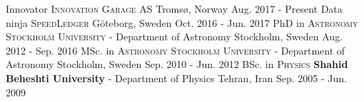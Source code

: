 \begin{cventries}
  \cventry
    {\normalsize Innovator}
    {\textsc{Innovation Garage AS}}
    {\normalsize Tromsø, Norway}
    {\normalsize Aug. 2017 - Present}
    {}
  \cventry
    {\normalsize Data ninja}
    {\textsc{SpeedLedger}}
    {\normalsize Göteborg, Sweden}
    {\normalsize Oct. 2016 - Jun. 2017}
    {}
  \cventry
    {\normalsize PhD in \textsc{Astronomy}}
    {\textsc{Stockholm University} - Department of Astronomy}
    {\normalsize Stockholm, Sweden}
    {\normalsize Aug. 2012 - Sep. 2016}
    {}
  \cventry
    {\normalsize MSc. in \textsc{Astronomy}}
    {\textsc{Stockholm University} - Department of Astronomy}
    {\normalsize Stockholm, Sweden}
    {\normalsize Sep. 2010 - Jun. 2012}
    {}
  \cventry
    {\normalsize BSc. in \textsc{Physics}}
    {\textbf{Shahid Beheshti University} - Department of Physics}
    {\normalsize Tehran, Iran}
    {\normalsize Sep. 2005 - Jun. 2009}
    {}
\end{cventries}
